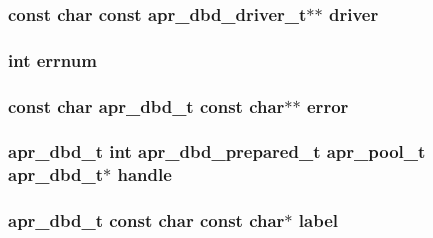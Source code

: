\subsubsection[{\texorpdfstring{driver}{driver}}]{\setlength{\rightskip}{0pt plus 5cm}const char const {\bf apr\+\_\+dbd\+\_\+driver\+\_\+t}$\ast$$\ast$ driver}\hypertarget{group__APR__Util__DBD_ga13380de2c65258ceb1b4a477f536d0ce}{}\label{group__APR__Util__DBD_ga13380de2c65258ceb1b4a477f536d0ce}
\subsubsection[{\texorpdfstring{errnum}{errnum}}]{ {\bf int} errnum}\hypertarget{group__APR__Util__DBD_ga705b7ca7fb0a9700b61ad996d694a778}{}\label{group__APR__Util__DBD_ga705b7ca7fb0a9700b61ad996d694a778}
\subsubsection[{\texorpdfstring{error}{error}}]{ const char {\bf apr\+\_\+dbd\+\_\+t} const char$\ast$$\ast$ error}\hypertarget{group__APR__Util__DBD_ga1c7a35441d749e860588bd9c9b2092d5}{}\label{group__APR__Util__DBD_ga1c7a35441d749e860588bd9c9b2092d5}
\subsubsection[{\texorpdfstring{handle}{handle}}]{ {\bf apr\+\_\+dbd\+\_\+t} {\bf int} {\bf apr\+\_\+dbd\+\_\+prepared\+\_\+t} {\bf apr\+\_\+pool\+\_\+t} {\bf apr\+\_\+dbd\+\_\+t}$\ast$ handle}\hypertarget{group__APR__Util__DBD_ga3ae8808b1c40205ec08c75783ac68810}{}\label{group__APR__Util__DBD_ga3ae8808b1c40205ec08c75783ac68810}
\subsubsection[{\texorpdfstring{label}{label}}]{ {\bf apr\+\_\+dbd\+\_\+t} const char const char$\ast$ label}\hypertarget{group__APR__Util__DBD_ga3b25265345988aead1789676cc374ba1}{}\label{group__APR__Util__DBD_ga3b25265345988aead1789676cc374ba1}
